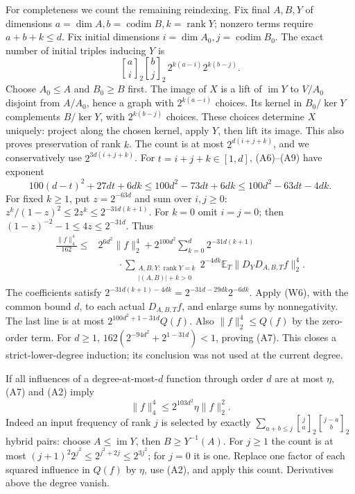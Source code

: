 For completeness we count the remaining reindexing. Fix final $A,B,Y$
of dimensions $a=\dim A,b=\operatorname{codim}B,k=\operatorname{rank}Y$;
nonzero terms require $a+b+k\le d$. Fix initial dimensions
$i=\dim A_0,j=\operatorname{codim}B_0$. The exact number of initial
triples inducing $Y$ is
\[
 {a\brack i}_2{b\brack j}_2\,2^{k(a-i)}2^{k(b-j)}.   \tag{A9}
\]
Choose $A_0\le A$ and $B_0\ge B$ first. The image of $X$ is a lift
of $\operatorname{im}Y$ to $V/A_0$ disjoint from $A/A_0$, hence a graph
with $2^{k(a-i)}$ choices. Its kernel in $B_0/\ker Y$ complements
$B/\ker Y$, with $2^{k(b-j)}$ choices. These choices determine $X$
uniquely: project along the chosen kernel, apply $Y$, then lift its
image. This also proves preservation of rank $k$.
The count is at most $2^{d(i+j+k)}$, and we conservatively use
$2^{3d(i+j+k)}$. For $t=i+j+k\in[1,d]$, (A6)--(A9) have exponent
\[
 100(d-t)^2+27dt+6dk
 \le100d^2-73dt+6dk
 \le100d^2-63dt-4dk.                                \tag{A10}
\]
For fixed $k\ge1$, put $z=2^{-63d}$ and sum over $i,j\ge0$:
$z^k/(1-z)^2\le2z^k\le2^{-31d(k+1)}$.
For $k=0$ omit $i=j=0$; then
$(1-z)^{-2}-1\le4z\le2^{-31d}$. Thus
\[
 \begin{split}
 \frac{\|f\|_4^4}{162}\le {}&2^{6d^2}\|f\|_2^4+
 2^{100d^2}\sum_{k=0}^d2^{-31d(k+1)}\\[-2pt]
 &\qquad\cdot\sum_{\substack{A,B,Y:\operatorname{rank}Y=k\\
                             |(A,B)|+k>0}}
 2^{-4dk}\mathbb E_T\|D_YD_{A,B,T}f\|_2^4.          \end{split}\tag{A11}
\]
The coefficients satisfy
$2^{-31d(k+1)-4dk}=2^{-31d-29dk}2^{-6dk}$.
Apply (W6), with the common bound $d$, to each actual $D_{A,B,T}f$,
and enlarge sums by nonnegativity. The last line is at most
$2^{100d^2+1-31d}Q(f)$. Also $\|f\|_2^4\le Q(f)$ by the zero-order
term. For $d\ge1$,
$162(2^{-94d^2}+2^{1-31d})<1$, proving (A7).
This closes a strict-lower-degree induction; its conclusion was not
used at the current degree.

If all influences of a degree-at-most-$d$ function through order $d$
are at most $\eta$, (A7) and (A2) imply
\[
 \|f\|_4^4\le2^{103d^2}\eta\|f\|_2^2.             \tag{A12}
\]
Indeed an input frequency of rank $j$ is selected by exactly
$\sum_{a+b\le j}{j\brack a}_2{j-a\brack b}_2$ hybrid pairs:
choose $A\le\operatorname{im}Y$, then $B\ge Y^{-1}(A)$.
For $j\ge1$ the count is at most
$(j+1)^2 2^{j^2}\le2^{j^2+2j}\le2^{3j^2}$; for $j=0$ it is one.
Replace one factor of each squared influence in $Q(f)$ by $\eta$,
use (A2), and apply this count. Derivatives above the degree vanish.

